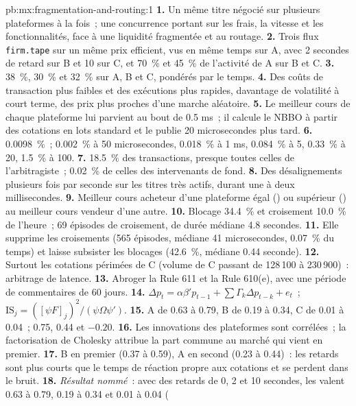 \begin{solution}{pb:mx:fragmentation-and-routing:1}
\textbf{1.} Un même titre négocié sur plusieurs plateformes à la fois~; une concurrence portant sur les frais, la vitesse et les fonctionnalités, face à une liquidité fragmentée et au routage.
\textbf{2.} Trois flux \texttt{firm.tape} sur un même prix efficient, vus en même temps sur A, avec 2 secondes de retard sur B et 10 sur C, et 70~\% et 45~\% de l'activité de A sur B
et C.
\textbf{3.} 38~\%, 30~\% et 32~\% sur A, B et C, pondérés par le temps.
\textbf{4.} Des coûts de transaction plus faibles et des exécutions plus rapides, davantage de volatilité à court terme, des prix plus proches d'une marche aléatoire.
\textbf{5.} Le meilleur cours de chaque plateforme lui parvient au bout de 0.5 ms~; il calcule le NBBO à partir des cotations en lots standard et le publie 20 microsecondes plus tard.
\textbf{6.} 0.0098~\%~; 0.002~\% à 50 microsecondes, 0.018~\% à 1 ms, 0.084~\% à 5, 0.33~\% à 20, 1.5~\% à 100.
\textbf{7.} 18.5~\% des transactions, presque toutes celles de l'arbitragiste~; 0.02~\% de celles des intervenants de fond.
\textbf{8.} Des désalignements plusieurs fois par seconde sur les titres très actifs, durant une à deux millisecondes.
\textbf{9.} Meilleur cours acheteur d'une plateforme égal () ou supérieur () au meilleur cours vendeur d'une autre.
\textbf{10.} Blocage 34.4~\% et croisement 10.0~\% de l'heure~; 69 épisodes de croisement, de durée médiane 4.8 secondes.
\textbf{11.} Elle supprime les croisements (565 épisodes, médiane 41 microsecondes, 0.07~\% du temps) et laisse subsister les blocages (42.6~\%, médiane 0.44 seconde).
\textbf{12.} Surtout les cotations périmées de C (volume de C passant de 128\,100 à 230\,900)~: arbitrage de latence.
\textbf{13.} Abroger la Rule 611 et la Rule 610(e), avec une période de commentaires de 60 jours.
\textbf{14.} $\Delta p_t=\alpha\beta'p_{t-1}+\sum\Gamma_k\Delta p_{t-k}+e_t$~; $\mathrm{IS}_j=([\psi F]_j)^2/(\psi\Omega\psi')$.
\textbf{15.} A de 0.63 à 0.79, B de 0.19 à 0.34, C de 0.01 à 0.04~;  0.75, 0.44 et $-0.20$.
\textbf{16.} Les innovations des plateformes sont corrélées~; la factorisation de Cholesky attribue la part commune au marché qui vient en premier.
\textbf{17.} B en premier (0.37 à 0.59), A en second (0.23 à 0.44)~: les retards sont plus courts que le temps de réaction propre aux cotations et se perdent dans le bruit.
\textbf{18.} \emph{Résultat nommé}~: avec des retards de 0, 2 et 10 secondes, les  valent 0.63 à 0.79, 0.19 à 0.34 et 0.01 à 0.04 (

\end{solution}
